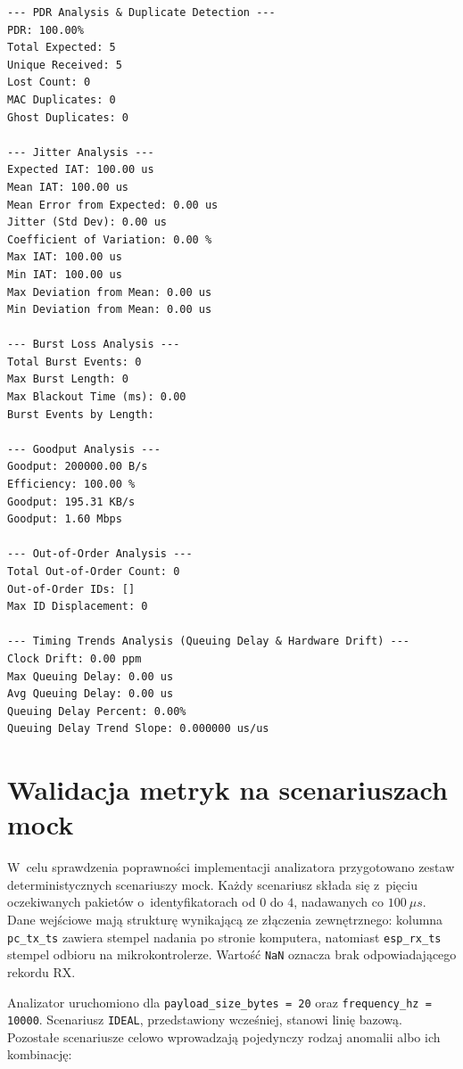 \begin{listing}[htbp]
    \caption{Struktura raportu QoS generowanego przez metodę dla pojedynczego scenariusza testowego (\texttt{calculate\_all\_metrics()}) \cite{espy_nexus_python_host}.}
    \label{lst:qos_sample_output}
    \begin{verbatim}
--- PDR Analysis & Duplicate Detection ---
PDR: 100.00%
Total Expected: 5
Unique Received: 5
Lost Count: 0
MAC Duplicates: 0
Ghost Duplicates: 0

--- Jitter Analysis ---
Expected IAT: 100.00 us
Mean IAT: 100.00 us
Mean Error from Expected: 0.00 us
Jitter (Std Dev): 0.00 us
Coefficient of Variation: 0.00 %
Max IAT: 100.00 us
Min IAT: 100.00 us
Max Deviation from Mean: 0.00 us
Min Deviation from Mean: 0.00 us

--- Burst Loss Analysis ---
Total Burst Events: 0
Max Burst Length: 0
Max Blackout Time (ms): 0.00
Burst Events by Length:

--- Goodput Analysis ---
Goodput: 200000.00 B/s
Efficiency: 100.00 %
Goodput: 195.31 KB/s
Goodput: 1.60 Mbps

--- Out-of-Order Analysis ---
Total Out-of-Order Count: 0
Out-of-Order IDs: []
Max ID Displacement: 0

--- Timing Trends Analysis (Queuing Delay & Hardware Drift) ---
Clock Drift: 0.00 ppm
Max Queuing Delay: 0.00 us
Avg Queuing Delay: 0.00 us
Queuing Delay Percent: 0.00%
Queuing Delay Trend Slope: 0.000000 us/us
\end{verbatim}
\end{listing}

\section{Walidacja metryk na scenariuszach mock}
\label{sec:qos_mock_scenarios}

W~celu sprawdzenia poprawności implementacji analizatora przygotowano zestaw deterministycznych scenariuszy mock.
Każdy scenariusz składa się z~pięciu oczekiwanych pakietów o~identyfikatorach od $0$ do $4$, nadawanych co $100~\mu s$.
Dane wejściowe mają strukturę wynikającą ze złączenia zewnętrznego: kolumna \texttt{pc\_tx\_ts} zawiera stempel nadania po stronie komputera, natomiast \texttt{esp\_rx\_ts} stempel odbioru na mikrokontrolerze.
Wartość \texttt{NaN} oznacza brak odpowiadającego rekordu RX.

Analizator uruchomiono dla \texttt{payload\_size\_bytes = 20} oraz \texttt{frequency\_hz = 10000}.
Scenariusz \texttt{IDEAL}, przedstawiony wcześniej, stanowi linię bazową.
Pozostałe scenariusze celowo wprowadzają pojedynczy rodzaj anomalii albo ich kombinację:

